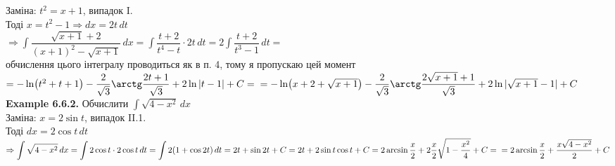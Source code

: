 \documentclass[a4paper, 14pt]{extarticle}
\def\huge{\displaystyle}
\def\bigline{\vspace{5mm}\\}
\def\ex#1{\textbf{Example {#1}}}
\def\bigline{\vspace{5mm}\\}
\begin{document}
Заміна: $t^2 = x+1$, випадок I.\\
Тоді $x = t^2 -1 \Rightarrow dx = 2t \,dt$\\
$\Rightarrow \huge \int \dfrac{\sqrt{x+1}+2}{(x+1)^2 - \sqrt{x+1}}\,dx = \int \dfrac{t+2}{t^4-t} \cdot 2t\,dt = 2 \int \dfrac{t+2}{t^3-1}\,dt =$\\
обчислення цього інтегралу проводиться як в п. 4, тому я пропускаю цей момент\\
$= -\ln(t^2+t+1) - \dfrac{2}{\sqrt{3}} \arctg \dfrac{2t+1}{\sqrt{3}} + 2 \ln|t-1|+ C = \\
= -\ln(x+2+\sqrt{x+1}) - \dfrac{2}{\sqrt{3}} \arctg \dfrac{2\sqrt{x+1}+1}{\sqrt{3}} + 2 \ln|\sqrt{x+1}-1| + C$
\bigline
\ex{6.6.2.} Обчислити $\huge \int \sqrt{4-x^2}\,dx$\\
Заміна: $x = 2\sin t$, випадок II.1.\\
Тоді $dx = 2 \cos t \,dt$\\
$\Rightarrow \huge \int \sqrt{4-x^2}\,dx = \int 2 \cos t \cdot 2 \cos t \,dt = \int 2(1+\cos 2t)\,dt = 2t + \sin 2t + C
\\ = 2t + 2 \sin t \cos t + C = 2 \arcsin \frac{x}{2} + 2 \frac{x}{2} \sqrt{1-\frac{x^2}{4}}+C = \\ = 2 \arcsin \frac{x}{2} + \dfrac{x \sqrt{4-x^2}}{2} + C$
\bigline
\end{document}
